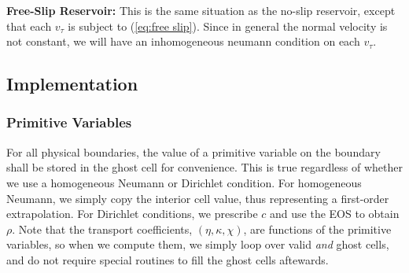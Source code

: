 \documentclass[final]{siamltex}
\begin{document}
{\bf Free-Slip Reservoir:} This is the same situation as the no-slip reservoir, except
that each $v_{\tau}$ is subject to (\ref{eq:free slip}).  Since in general
the normal velocity is not constant, we will have an inhomogeneous neumann condition
on each $v_{\tau}$.

\subsection{Implementation}

\subsubsection{Primitive Variables}
For all physical boundaries, the value of a primitive
variable on the boundary shall be stored in the ghost cell for convenience.  This
is true regardless of whether we use a homogeneous Neumann or Dirichlet condition.
For homogeneous Neumann, we simply copy the interior cell value, thus representing
a first-order extrapolation.  For Dirichlet conditions, we prescribe $c$ and use
the EOS to obtain $\rho$.  Note that the transport coefficients, $(\eta,\kappa,\chi)$,
are functions of the primitive variables, so when we compute them, we simply loop
over valid {\it and} ghost cells, and do not require special routines to fill
the ghost cells aftewards.
\end{document}
